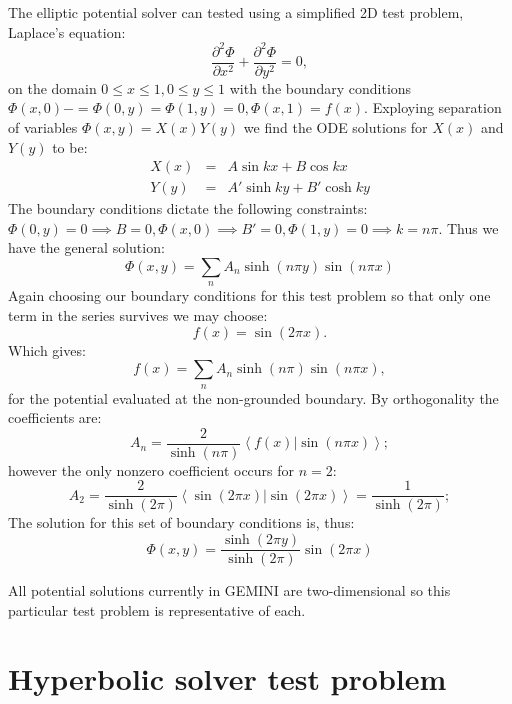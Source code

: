 \documentclass[11pt,letterpaper]{article}
\begin{document}
The elliptic potential solver can tested using a simplified 2D test problem, Laplace's equation:
\begin{equation}
\frac{\partial^2 \Phi}{\partial x^2} + \frac{\partial^2 \Phi}{\partial y^2} = 0, 
\end{equation}
on the domain $0 \le x \le 1, 0 \le y \le 1$ with the boundary conditions $\Phi(x,0)-=\Phi(0,y)=\Phi(1,y)=0, \Phi(x,1)=f(x)$.  Exploying separation of variables $\Phi(x,y)=X(x)Y(y)$ we find the ODE solutions for $X(x)$ and $Y(y)$ to be:
\begin{eqnarray}
X(x) &=& A \sin kx + B \cos kx \\
Y(y) &=& A' \sinh ky + B' \cosh ky
\end{eqnarray}
The boundary conditions dictate the following constraints:  $\Phi(0,y)=0 \implies B=0, \Phi(x,0) \implies B'=0, \Phi(1,y)=0 \implies k=n \pi$.  Thus we have the general solution:
\begin{equation}
\Phi(x,y) = \sum_n A_n \sinh (n \pi y) \sin (n \pi x)
\end{equation}
Again choosing our boundary conditions for this test problem so that only one term in the series survives we may choose:
\begin{equation}
f(x) = \sin(2 \pi x).
\end{equation}
Which gives:
\begin{equation}
f(x) = \sum_n A_n \sinh (n \pi) \sin (n \pi x),
\end{equation}
for the potential evaluated at the non-grounded boundary.  By orthogonality the coefficients are:  
\begin{equation}
A_n = \frac{2}{\sinh (n \pi)} \left< f(x) | \sin (n \pi x) \right>; 
\end{equation}
however the only nonzero coefficient occurs for $n=2$:
\begin{equation}
A_2 = \frac{2}{\sinh (2 \pi)} \left< \sin(2 \pi x) | \sin (2 \pi x) \right> = \frac{1}{\sinh(2 \pi)}; 
\end{equation}
The solution for this set of boundary conditions is, thus: 
\begin{equation}
\Phi(x,y) = \frac{\sinh (2 \pi y)}{\sinh(2 \pi)} \sin (2 \pi x)
\end{equation}

All potential solutions currently in GEMINI are two-dimensional so this particular test problem is representative of each.  


\section{Hyperbolic solver test problem}
\end{document}
